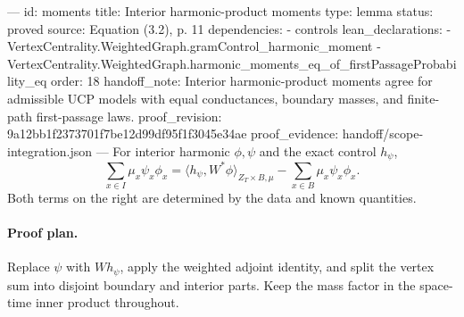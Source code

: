 ---
id: moments
title: Interior harmonic-product moments
type: lemma
status: proved
source: Equation (3.2), p. 11
dependencies:
- controls
lean_declarations:
- VertexCentrality.WeightedGraph.gramControl_harmonic_moment
- VertexCentrality.WeightedGraph.harmonic_moments_eq_of_firstPassageProbability_eq
order: 18
handoff_note: Interior harmonic-product moments agree for admissible UCP models with equal conductances, boundary masses, and finite-path first-passage laws.
proof_revision: 9a12bb1f2373701f7be12d99df95f1f3045e34ae
proof_evidence: handoff/scope-integration.json
---
For interior harmonic $\phi,\psi$ and the exact control $h_\psi$, \[\sum_{x\in I}\mu_x\psi_x\phi_x=\langle h_\psi,W^*\phi\rangle_{Z_T\times B,\mu}-\sum_{x\in B}\mu_x\psi_x\phi_x.\] Both terms on the right are determined by the data and known quantities.

\paragraph{Proof plan.}
Replace $\psi$ with $Wh_\psi$, apply the weighted adjoint identity, and split the vertex sum into disjoint boundary and interior parts. Keep the mass factor in the space-time inner product throughout.
